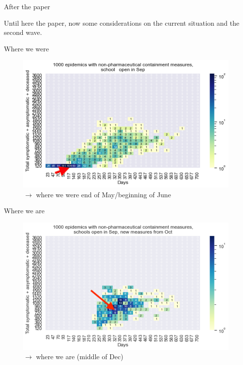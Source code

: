\documentclass[8pt]{beamer}
\begin{document}
\begin{frame}{After the paper}

Until here the paper, now some considerations on the current situation and the second wave.

\end{frame}
\begin{frame}{Where we were}

\begin{figure}[H]
\center
\includegraphics[scale=0.55]{WhereWeWere.png}

\caption{{\larger[4]$\rightarrow$} where we were end of May/beginning of June} 
\label{WhereWeWere}
\end{figure}
\end{frame}

\begin{frame}{Where we are}

\begin{figure}[H]
\center
\includegraphics[scale=0.55]{WhereWeAreB.png}

\caption{{\larger[4]$\rightarrow$} where we are (middle of Dec)} 
\label{WhereWeAre}
\end{figure}

\end{frame}
\end{document}
